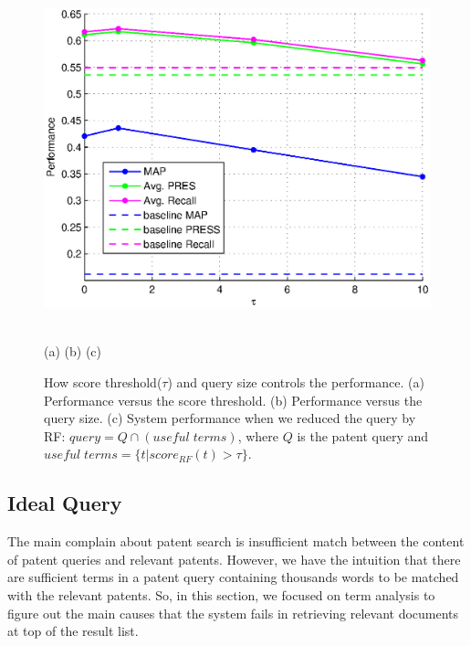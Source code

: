 \documentclass{sig-alternate}
\begin{document}
\begin{figure}
\begin{center}
\hfill
\begin{minipage}[b]{0.3\linewidth}
\includegraphics[width=\linewidth]{figs/opt-patentquery-tau.eps}
\end{minipage}
\vspace{-0.5mm}\\
 \hspace{2mm}(a) \hspace{55mm}(b) \hspace{58mm} (c)
\caption{\footnotesize
How score threshold($\tau$) and query size controls the performance.
(a) Performance versus the score threshold. (b) Performance versus the query size. (c) System performance when we reduced the query by RF: $ query = Q\cap (useful \; terms) $, where $ Q $ is the patent query and $ useful\; terms = \{t| score_{RF}(t)>\tau\} $.}
\vspace{-4mm}
\end{center}
\label{fig:control}
\end{figure}
\subsection{Ideal Query}
The main complain about patent search is insufficient match between the content of patent queries and relevant
patents\cite{lupu2013patent}\cite{magdy2012toward}. However, we have the intuition that there are sufficient terms in a patent query containing thousands words to be matched with the relevant patents. So, in this section, we focused on term analysis to figure out the main causes that the system fails in retrieving relevant documents at top of the result list. 
\end{document}
